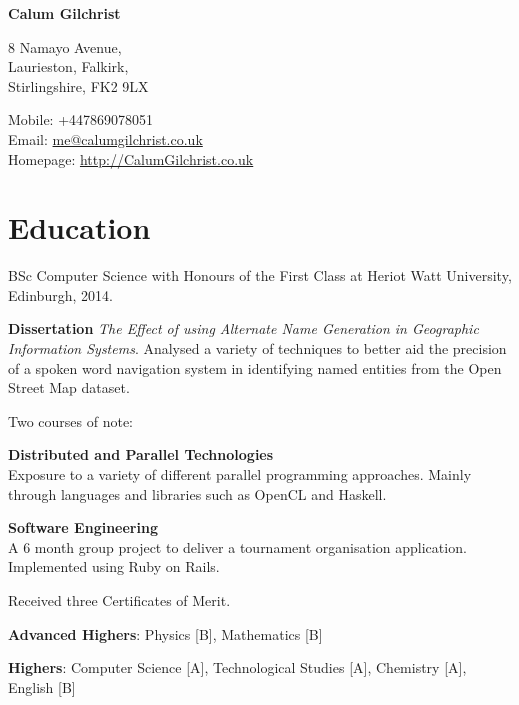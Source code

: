 \documentclass[11pt,a4paper]{article}
\def\name{Calum Gilchrist}
\renewenvironment{itemize}{
  \begin{list}{}{
    \setlength{\leftmargin}{1em}
    \setlength{\itemsep}{0.25em}
    \setlength{\parskip}{0pt}
    \setlength{\parsep}{0.25em}
    \renewcommand{\labelitemi}{$\bullet$}
  }
}{
  \end{list}
}
\begin{document}
%

\setlength{\parskip}{0em}


\centerline{\huge \bf \name}

\bigskip

\begin{minipage}[t]{0.495\textwidth}
  8 Namayo Avenue, \\
  Laurieston, Falkirk, \\
  Stirlingshire, FK2 9LX
\end{minipage}
\begin{minipage}[t]{0.495\textwidth}
  Mobile: +447869078051 \\
  Email: \href{mailto:me@calumgilchrist.co.uk}{me@calumgilchrist.co.uk} \\
  Homepage: \href{http://calumgilchrist.co.uk/}{http://CalumGilchrist.co.uk}
\end{minipage}

\section*{Education}

\begin{itemize}
    \item BSc Computer Science with Honours of the First Class at Heriot Watt University, Edinburgh, 2014.

    \begin{itemize}
        \item \textbf{Dissertation} \emph{The Effect of using Alternate Name Generation in Geographic Information Systems}. Analysed a variety of techniques to better aid the precision of a spoken word navigation system in identifying named entities from the Open Street Map dataset.
        \item Two courses of note:
            \begin{itemize}
                \item \textbf{Distributed and Parallel Technologies} \\
                    Exposure to a variety of different parallel programming approaches. Mainly through languages and libraries such as OpenCL and Haskell.
                \item \textbf{Software Engineering} \\
                    A 6 month group project to deliver a tournament organisation application. Implemented using Ruby on Rails.
            \end{itemize}
        \item Received three Certificates of Merit. 
    \end{itemize}

    \item \textbf{Advanced Highers}: Physics [B], Mathematics [B]
    \item \textbf{Highers}: Computer Science [A], Technological Studies [A], Chemistry [A], English [B]
\end{itemize}
\end{document}
